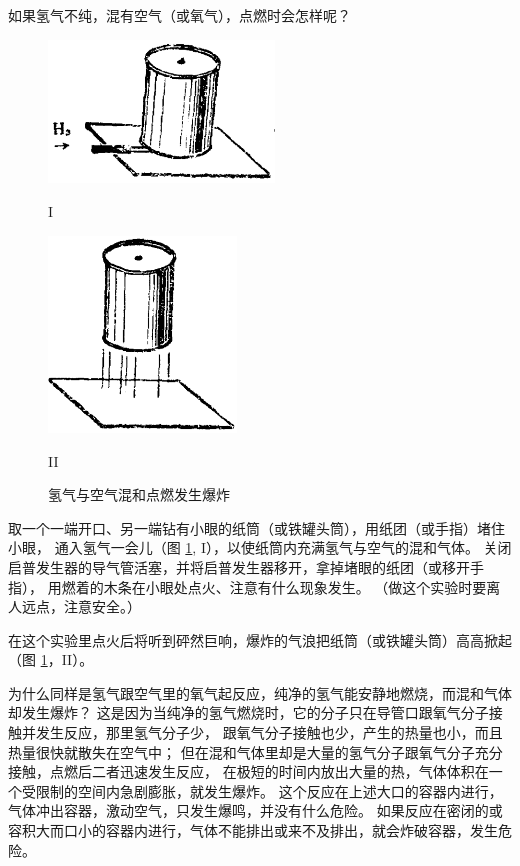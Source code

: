 如果氢气不纯，混有空气（或氧气），点燃时会怎样呢？


\begin{figure}[htbp]
    \centering
    \begin{minipage}[b]{7cm}
        \centering
        \includegraphics[width=6cm]{../pic/czhx1-ch2-9-1}
        \caption*{I}
    \end{minipage}
    \qquad
    \begin{minipage}[b]{7cm}
        \centering
        \includegraphics[width=5cm]{../pic/czhx1-ch2-9-2}
        \caption*{II}
    \end{minipage}
    \caption{氢气与空气混和点燃发生爆炸}\label{fig:2-9}
\end{figure}


\begin{shiyan}
    取一个一端开口、另一端钻有小眼的纸筒（或铁罐头筒），用纸团（或手指）堵住小眼，
    通入氢气一会儿（图 \ref{fig:2-9}, I），以使纸筒内充满氢气与空气的混和气体。
    关闭启普发生器的导气管活塞，并将启普发生器移开，拿掉堵眼的纸团（或移开手指），
    用燃着的木条在小眼处点火、注意有什么现象发生。
    （做这个实验时要离人远点，注意安全。）
\end{shiyan}

在这个实验里点火后将听到砰然巨响，爆炸的气浪把纸筒（或铁罐头筒）高高掀起（图 \ref{fig:2-9}，II）。

为什么同样是氢气跟空气里的氧气起反应，纯净的氢气能安静地燃烧，而混和气体却发生爆炸？
这是因为当纯净的氢气燃烧时，它的分子只在导管口跟氧气分子接触并发生反应，那里氢气分子少，
跟氧气分子接触也少，产生的热量也小，而且热量很快就散失在空气中；
但在混和气体里却是大量的氢气分子跟氧气分子充分接触，点燃后二者迅速发生反应，
在极短的时间内放出大量的热，气体体积在一个受限制的空间内急剧膨胀，就发生爆炸。
这个反应在上述大口的容器内进行，气体冲出容器，激动空气，只发生爆鸣，并没有什么危险。
如果反应在密闭的或容积大而口小的容器内进行，气体不能排出或来不及排出，就会炸破容器，发生危险。

